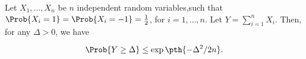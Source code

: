 \begin {theorem} Let $X_1, \ldots , X_n$ be $n$ independent random variables,\newline such that $\Prob {X_i =1} =\Prob {X_i=-1} = \frac {1}{2}$, for $i=1,\ldots , n$. Let $Y = \sum _{i=1}^n X_i$. Then, for any $\Delta >0$, we have \begin {align*} \Prob {\Bigl . Y \geq \Delta } \leq \exp \pth {-\Delta ^2/2n}. \end {align*} \end {theorem}
